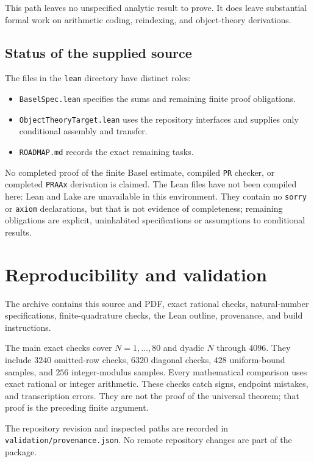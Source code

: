 \documentclass[11pt,a4paper]{article}
\theoremstyle{remark}\newtheorem{remark}[theorem]{Remark}
\begin{document}
This path leaves no unspecified analytic result to prove. It does
leave substantial formal work on arithmetic coding, reindexing,
and object-theory derivations.

\subsection{Status of the supplied source}

The files in the \texttt{lean} directory have distinct roles:
\begin{itemize}
\item \texttt{BaselSpec.lean} specifies the sums and remaining
finite proof obligations.
\item \texttt{ObjectTheoryTarget.lean} uses the repository interfaces
and supplies only conditional assembly and transfer.
\item \texttt{ROADMAP.md} records the exact remaining tasks.
\end{itemize}

No completed proof of the finite Basel estimate, compiled
\texttt{PR} checker, or completed \texttt{PRAAx} derivation is
claimed. The Lean files have not been compiled here: Lean and
Lake are unavailable in this environment. They contain no
\texttt{sorry} or \texttt{axiom} declarations, but that is not
evidence of completeness; remaining obligations are explicit,
uninhabited specifications or assumptions to conditional results.

\section{Reproducibility and validation}

The archive contains this source and PDF, exact rational checks,
natural-number specifications, finite-quadrature checks, the Lean
outline, provenance, and build instructions.

The main exact checks cover $N=1,\ldots,80$ and dyadic $N$ through
$4096$. They include $3240$ omitted-row checks, $6320$ diagonal
checks, $428$ uniform-bound samples, and $256$ integer-modulus
samples. Every mathematical comparison uses exact rational or
integer arithmetic. These checks catch signs, endpoint mistakes,
and transcription errors. They are not the proof of the universal
theorem; that proof is the preceding finite argument.

The repository revision and inspected paths are recorded in
\texttt{validation/provenance.json}. No remote repository changes
are part of the package.
\end{document}
